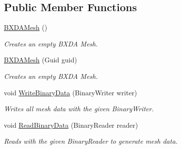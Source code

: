 \subsection*{Public Member Functions}
\begin{DoxyCompactItemize}
\item 
\hyperlink{class_b_x_d_a_mesh_a411296f78a7f36d3de715d1a8fff8e77}{B\+X\+D\+A\+Mesh} ()
\begin{DoxyCompactList}\small\item\em Creates an empty B\+X\+DA Mesh. \end{DoxyCompactList}\item 
\hyperlink{class_b_x_d_a_mesh_a9ab1e7e2173e5e6a26bcd10bfce70635}{B\+X\+D\+A\+Mesh} (Guid guid)
\begin{DoxyCompactList}\small\item\em Creates an empty B\+X\+DA Mesh. \end{DoxyCompactList}\item 
void \hyperlink{class_b_x_d_a_mesh_a5ee3b3956597c24da796eb6242bb9940}{Write\+Binary\+Data} (Binary\+Writer writer)
\begin{DoxyCompactList}\small\item\em Writes all mesh data with the given Binary\+Writer. \end{DoxyCompactList}\item 
void \hyperlink{class_b_x_d_a_mesh_a1178be877fb442e6a8137f045ccc3c20}{Read\+Binary\+Data} (Binary\+Reader reader)
\begin{DoxyCompactList}\small\item\em Reads with the given Binary\+Reader to generate mesh data. \end{DoxyCompactList}\end{DoxyCompactItemize}
